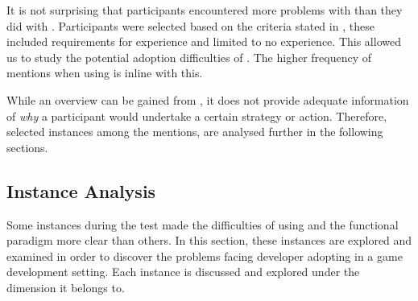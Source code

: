 It is not surprising that participants encountered more problems with \fs than they did with \cs. Participants were selected based on the criteria stated in , these included requirements for \cs experience and limited to no  \fs experience. This allowed us to study the potential adoption difficulties of \fs. The higher frequency of mentions when using \fs is inline with this.

While an overview can be gained from , it does not provide adequate information of \textit{why} a participant would undertake a certain strategy or action. Therefore, selected instances among the mentions, are analysed further in the following sections.

\subsection{Instance Analysis}
Some instances during the test made the difficulties of using \fs and the functional paradigm more clear than others. In this section, these instances are explored and examined in order to discover the problems facing developer adopting \fs in a game development setting. Each instance is discussed and explored under the dimension it belongs to.




